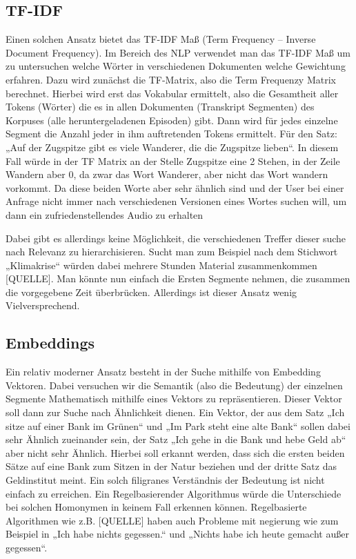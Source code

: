 \subsection{TF-IDF}

Einen solchen Ansatz bietet das TF-IDF Maß (Term Frequency – Inverse Document Frequency). 
Im Bereich des NLP verwendet man das TF-IDF Maß um zu untersuchen welche Wörter in verschiedenen Dokumenten welche Gewichtung erfahren. 
Dazu wird zunächst die TF-Matrix, also die Term Frequenzy Matrix berechnet. 
Hierbei wird erst das Vokabular ermittelt, also die Gesamtheit aller Tokens (Wörter) die es in allen Dokumenten (Transkript Segmenten) des Korpuses (alle heruntergeladenen Episoden) gibt. 
Dann wird für jedes einzelne Segment die Anzahl jeder in ihm auftretenden Tokens ermittelt. 
Für den Satz: „Auf der Zugspitze gibt es viele Wanderer, die die Zugspitze lieben“. 
In diesem Fall würde in der TF Matrix an der Stelle Zugspitze eine 2 Stehen, in der Zeile Wandern aber 0, da zwar das Wort Wanderer, aber nicht das Wort wandern vorkommt. 
Da diese beiden Worte aber sehr ähnlich sind und der User bei einer Anfrage nicht immer nach verschiedenen Versionen eines Wortes suchen will, um dann ein zufriedenstellendes Audio zu erhalten


Dabei gibt es allerdings keine Möglichkeit, die verschiedenen Treffer dieser suche nach Relevanz zu hierarchisieren. Sucht man zum Beispiel nach dem Stichwort „Klimakrise“ würden dabei mehrere Stunden Material zusammenkommen [QUELLE]. 
Man könnte nun einfach die Ersten Segmente nehmen, die zusammen die vorgegebene Zeit überbrücken. Allerdings ist dieser Ansatz wenig Vielversprechend. 

\subsection{Embeddings}

 

Ein relativ moderner Ansatz besteht in der Suche mithilfe von Embedding Vektoren. Dabei versuchen wir die Semantik (also die Bedeutung) der einzelnen Segmente Mathematisch mithilfe eines Vektors zu repräsentieren. Dieser Vektor soll dann zur Suche nach Ähnlichkeit dienen. Ein Vektor, der aus dem Satz „Ich sitze auf einer Bank im Grünen“ und „Im Park steht eine alte Bank“ sollen dabei sehr Ähnlich zueinander sein, der Satz „Ich gehe in die Bank und hebe Geld ab“ aber nicht sehr Ähnlich. Hierbei soll erkannt werden, dass sich die ersten beiden Sätze auf eine Bank zum Sitzen in der Natur beziehen und der dritte Satz das Geldinstitut meint. Ein solch filigranes Verständnis der Bedeutung ist nicht einfach zu erreichen. 
Ein Regelbasierender Algorithmus würde die Unterschiede bei solchen Homonymen in keinem Fall erkennen können. Regelbasierte Algorithmen wie z.B. [QUELLE] haben auch Probleme mit negierung wie zum Beispiel in „Ich habe nichts gegessen.“ und „Nichts habe ich heute gemacht außer gegessen“.

